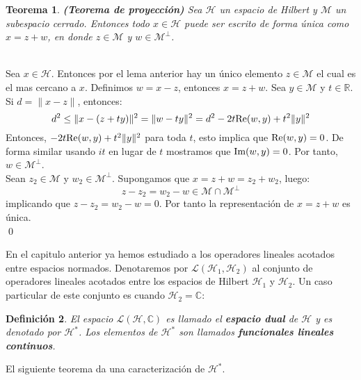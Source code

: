 \documentclass[12pt]{book}
\numberwithin{equation}{chapter}
\newtheorem{theorem}{Teorema}[chapter]
\newtheorem{definition}[theorem]{Definici\'on}
\def\n{\noindent}
\def\R{\mathbb{R}}
\def\C{\mathbb{C}}
\def\L{\mathcal{L}}
\def\H{\mathcal{H}}
\def\M{\mathcal{M}}
\begin{document}
\vspace{5 mm}

\begin{theorem}
{\bf (Teorema de proyecci\'on)} Sea $\H$ un espacio de Hilbert y $\M$ un subespacio cerrado. Entonces todo $x \in \H$ puede ser escrito de forma \'unica como $x= z+w$, en donde $z \in \M$ y $w \in \M^{\perp}$.   
\end{theorem}
\n {\bf Demostraci\'on}\\
Sea $x \in \H$. Entonces por el lema anterior hay un \'unico elemento $z \in \M$ el cual es el mas cercano a $x$. Definimos $w= x-z$, entonces $x=z+w$. Sea $y \in \M$ y $ t \in \R$. Si $ d= \|x-z\| $, entonces:
$$ d^{2} \leq \| x-(z+ty) \|^{2} = \| w-ty \|^{2}= d^{2} -2t\hbox{Re}(w,y) + t^{2} \|y\|^{2} $$ 
Entonces, $ -2t\hbox{Re}(w,y) + t^{2} \|y\|^{2} $ para toda $t$, esto implica que $\hbox{Re}(w,y)=0$. De forma similar usando $it$ en lugar de $t$ mostramos que $\hbox{Im}(w,y)=0$. Por tanto, $w \in \M^{\perp}$.\\
Sean $ z_{2}\in \M $ y $w_{2} \in \M^{\perp} $. Supongamos que $ x= z+w=z_{2}+w_{2} $, luego: 
$$ z-z_{2}=w_{2}-w \in \M \cap \M^{\perp} $$ 
implicando que $ z-z_{2}=w_{2}-w=0 $. Por tanto la representaci\'on de $x=z+w$ es \'unica. \\ \qed 

\vspace{5 mm}

En el capitulo anterior ya hemos estudiado a los operadores lineales acotados entre espacios normados. Denotaremos por $\L(\H_{1},\H_{2})$ al conjunto de operadores lineales acotados entre los espacios de Hilbert $\H_{1}$ y $\H_{2}$. Un caso particular de este conjunto es cuando $\H_{2}= \C$:

\begin{definition}
El espacio $\L(\H,\C)$ es llamado el {\bf espacio dual} de $\H$ y es denotado por $\H^{*}$. Los elementos de $\H^{*}$ son llamados {\bf funcionales lineales continuos}.
\end{definition}

\n El siguiente teorema da una caracterizaci\'on de $\H^{*}$.
\end{document}
